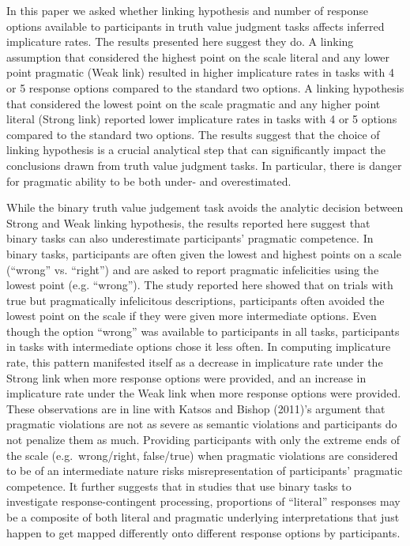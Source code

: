 \documentclass[man]{apa6}
\theoremstyle{definition}
\theoremstyle{definition}
\theoremstyle{definition}
\theoremstyle{remark}
\begin{document}
In this paper we asked whether linking hypothesis and number of
response options available to participants in truth value judgment tasks
affects inferred implicature rates. The results presented here suggest
they do. A linking assumption that considered the highest point on the
scale literal and any lower point pragmatic (Weak link) resulted in
higher implicature rates in tasks with 4 or 5 response options compared
to the standard two options. A linking hypothesis that considered the
lowest point on the scale pragmatic and any higher point literal (Strong
link) reported lower implicature rates in tasks with 4 or 5 options
compared to the standard two options. The results suggest that the
choice of linking hypothesis is a crucial analytical step that can
significantly impact the conclusions drawn from truth value judgment
tasks. In particular, there is danger for pragmatic ability to be both
under- and overestimated.

While the binary truth value judgement task avoids the analytic decision
between Strong and Weak linking hypothesis, the results reported here
suggest that binary tasks can also underestimate participants' pragmatic
competence. In binary tasks, participants are often given the lowest and
highest points on a scale (\enquote{wrong} vs. \enquote{right}) and are
asked to report pragmatic infelicities using the lowest point (e.g.
\enquote{wrong}). The study reported here showed that on trials with
true but pragmatically infelicitous descriptions, participants often
avoided the lowest point on the scale if they were given more
intermediate options. Even though the option \enquote{wrong} was
available to participants in all tasks, participants in tasks with
intermediate options chose it less often. In computing implicature rate,
this pattern manifested itself as a decrease in implicature rate under
the Strong link when more response options were provided, and an
increase in implicature rate under the Weak link when more response
options were provided. These observations are in line with Katsos and
Bishop (2011)'s argument that pragmatic violations are not as
severe as semantic violations and participants do not penalize them as
much. Providing participants with only the extreme ends of the scale
(e.g.~wrong/right, false/true) when pragmatic violations are considered
to be of an intermediate nature risks misrepresentation of participants'
pragmatic competence. It further suggests that in studies that use
binary tasks to investigate response-contingent processing, proportions
of \enquote{literal} responses may be a composite of both literal and
pragmatic underlying interpretations that just happen to get mapped
differently onto different response options by participants.
\end{document}

